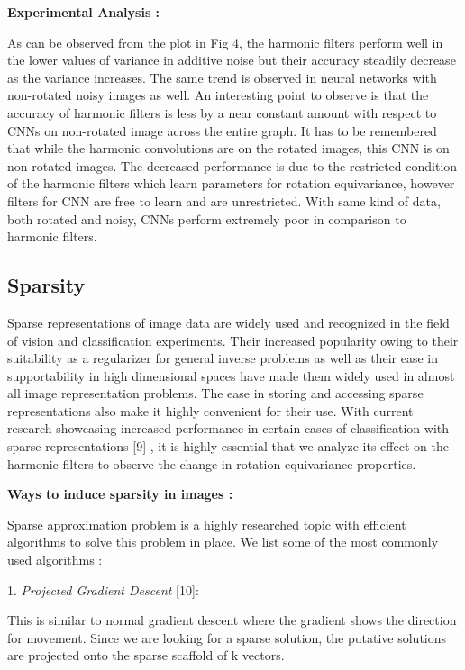 \documentclass{article}
\begin{document}
\textbf{Experimental Analysis :}

As can be observed from the plot in Fig 4, the harmonic filters perform well in the lower values of variance in additive noise but their accuracy steadily decrease as the variance increases. The same trend is observed in neural networks with non-rotated noisy images as well. An interesting point to observe is that the accuracy of harmonic filters is less by a near constant amount with respect to CNNs on non-rotated image across the entire graph. It has to be remembered that while the harmonic convolutions are on the rotated images, this CNN is on non-rotated images. The decreased performance is due to the restricted condition of the harmonic filters which learn parameters for rotation equivariance, however filters for CNN are free to learn and are unrestricted.
With same kind of data, both rotated and noisy, CNNs perform extremely poor in comparison to harmonic filters.

\subsection{Sparsity}

Sparse representations of image data are widely used and recognized in the field of vision and classification experiments. Their increased popularity owing to their suitability as a regularizer for general inverse problems as well as their ease in supportability in high dimensional spaces have made them widely used in almost all image representation problems. The ease in storing and accessing sparse representations also make it highly convenient for their use. With current research showcasing increased performance in certain cases of classification with sparse representations [9] , it is highly essential that we analyze its effect on the harmonic filters to observe the change in rotation equivariance properties.

\textbf{Ways to induce sparsity in images :}

Sparse approximation problem is a highly researched topic with efficient algorithms to solve this problem in place. We list some of the most commonly used algorithms :

1.	\emph{Projected Gradient Descent} [10]: 

This is similar to normal gradient descent where the gradient shows the direction for movement. Since we are looking for a sparse solution, the putative solutions are projected onto the sparse scaffold of k vectors.
\end{document}
